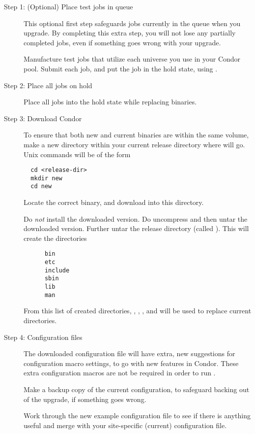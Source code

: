 \begin{description}
\item[Step 1:  (Optional) Place test jobs in queue]
This optional first step safeguards jobs currently in the
queue when you upgrade.
By completing this extra step, you will not lose any
partially completed jobs, even if something goes wrong with
your upgrade.

Manufacture test jobs that utilize each universe you use in
your Condor pool.
Submit each job, and put the job in the hold state, 
using .

\item[Step 2:  Place all jobs on hold]
Place all jobs into the hold state while replacing binaries.


\item[Step 3:  Download Condor \VersionNotice]
To ensure that both new and current binaries are within
the same volume,
make a new directory within your current release
directory where \VersionNotice 
will go. 
Unix commands will be of the form
\begin{verbatim}
  cd <release-dir>
  mkdir new
  cd new
\end{verbatim}

Locate the correct \VersionNotice
binary, and download into this  directory.

Do \emph{not} install the downloaded version.
Do uncompress and then untar the downloaded version.
Further untar the release directory (called ).
This will create the directories
\begin{verbatim}
      bin
      etc
      include
      sbin
      lib
      man
\end{verbatim}
From this list of created directories, 
,
,
, and
 will be used to replace current directories.

\item[Step 4:  Configuration files]
The downloaded \VersionNotice
configuration file will have extra, new suggestions
for configuration macro settings,
to go with new features in Condor.
These extra configuration macros
are not be required in order to run \VersionNotice.

Make a backup copy of the current configuration, to
safeguard backing out of the upgrade, if something goes wrong.

Work through the new
\VersionNotice
example configuration file to see if there
is anything useful and merge with your site-specific (current)
configuration file.


\end{description}
